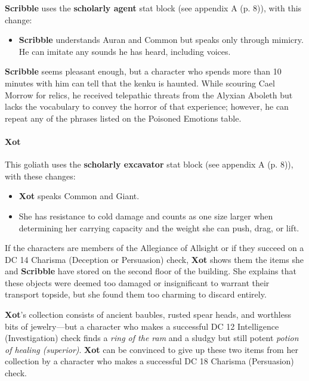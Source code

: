 \documentclass[letterpaper, 11pt, bg=full, twocolumn]{dndbook}
\begin{document}
\textbf{Scribble} uses the \textbf{scholarly agent} stat block (see appendix A (p. 8)), with this change:

\begin{itemize}
\item \textbf{Scribble} understands Auran and Common but speaks only through mimicry. He can imitate any sounds he has heard, including voices.
\end{itemize}

\textbf{Scribble} seems pleasant enough, but a character who spends more than 10 minutes with him can tell that the kenku is haunted. While scouring Cael Morrow for relics, he received telepathic threats from the Alyxian Aboleth but lacks the vocabulary to convey the horror of that experience; however, he can repeat any of the phrases listed on the Poisoned Emotions table.

\paragraph{Xot}

This goliath uses the \textbf{scholarly excavator} stat block (see appendix A (p. 8)), with these changes:

\begin{itemize}
\item \textbf{Xot} speaks Common and Giant.
\item She has resistance to cold damage and counts as one size larger when determining her carrying capacity and the weight she can push, drag, or lift.
\end{itemize}

If the characters are members of the Allegiance of Allsight or if they succeed on a DC 14 Charisma (Deception or Persuasion) check, \textbf{Xot} shows them the items she and \textbf{Scribble} have stored on the second floor of the building. She explains that these objects were deemed too damaged or insignificant to warrant their transport topside, but she found them too charming to discard entirely.

\textbf{Xot}'s collection consists of ancient baubles, rusted spear heads, and worthless bits of jewelry---but a character who makes a successful DC 12 Intelligence (Investigation) check finds a \textit{ring of the ram} and a sludgy but still potent \textit{potion of healing (superior)}. \textbf{Xot} can be convinced to give up these two items from her collection by a character who makes a successful DC 18 Charisma (Persuasion) check.
\end{document}
